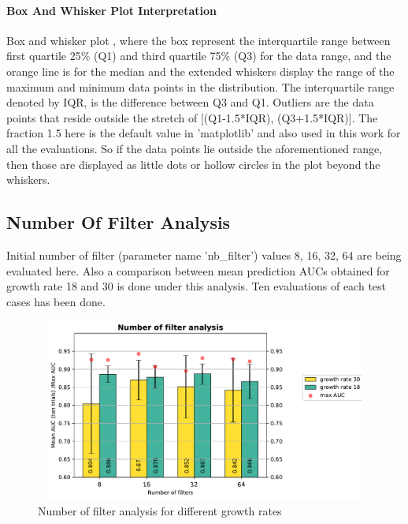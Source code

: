 \paragraph{Box And Whisker Plot Interpretation\\}
Box and whisker plot \cite{boxplot}, where the box represent the interquartile range between first quartile 25\% (Q1) and third quartile 75\% (Q3) for the data range, and the orange line is for the median and the extended whiskers display the 
range of the maximum and minimum data points in the distribution. The interquartile range denoted by IQR, is the difference between Q3 and Q1. Outliers are the data points that reside outside the stretch of [(Q1-1.5*IQR), (Q3+1.5*IQR)].
The fraction 1.5 here is the default value in 'matplotlib' and also used in this work for all the evaluations. So if the data points lie outside the aforementioned range, then those are displayed as little dots or hollow circles in the plot 
beyond the whiskers.


\subsection{Number Of Filter Analysis}
Initial number of filter (parameter name 'nb\_filter') values 8, 16, 32, 64 are being evaluated here. Also a comparison between mean prediction AUCs obtained for growth rate 18 and 30 is done under this analysis. Ten evaluations of each test cases has been done.

\begin{figure}[ht]
\centering
\includegraphics[width = 12cm, height=6cm]{images/densenet/siamese/densenet_siamese_nb_filter}
\caption{Number of filter analysis for different growth rates}
\label{fig:nb_filter_vs_auc_growthrate_compare}
\end{figure}

